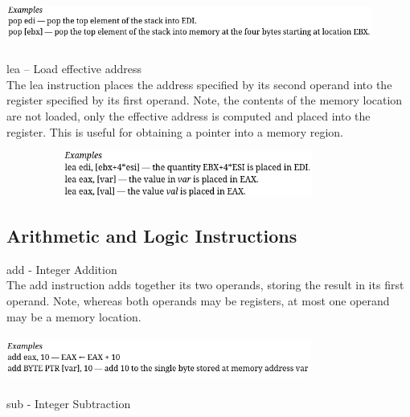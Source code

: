 \documentclass[12pt]{extarticle}
\begin{document}
\begin{center}

    \includegraphics[width=12cm, height=1.5cm]{pop}
    
 \end{center}

 lea -- Load effective address \\

 The lea instruction places the address specified by its second operand into the register specified by its first operand. Note, the contents of the memory location are not loaded, only the effective address is computed and placed into the register. This is useful for obtaining a pointer into a memory region.

 \begin{center}

    \includegraphics[width=12cm, height=1.5cm]{lea}
    
 \end{center}

 \subsection{Arithmetic and Logic Instructions}

 add - Integer Addition \\

 The add instruction adds together its two operands, storing the result in its first operand. Note, whereas both operands may be registers, at most one operand may be a memory location. 

\begin{center}

    \includegraphics[width=10cm, height=1.5cm]{add}
    
 \end{center}

 sub - Integer Subtraction \\
\end{document}
